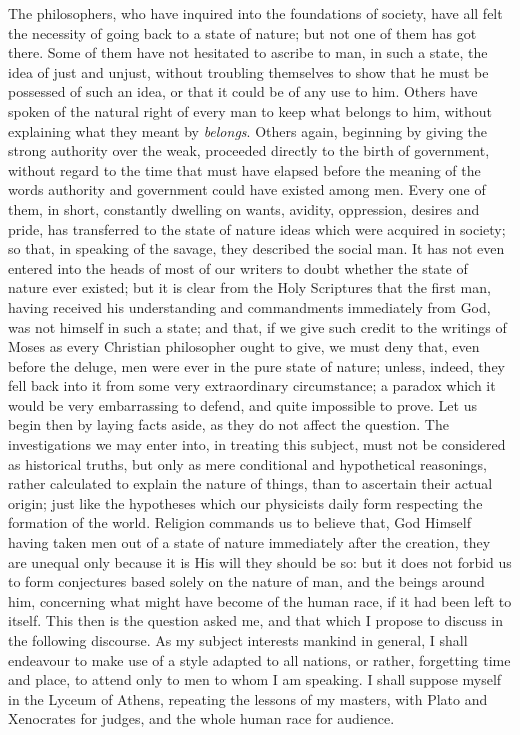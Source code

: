 \documentclass[12pt]{report}
\begin{document}
The philosophers, who have inquired into the foundations of society, have all felt the necessity of going back to a state of nature; but not one of them has got there. Some of them have not hesitated to ascribe to man, in such a state, the idea of just and unjust, without troubling themselves to show that he must be possessed of such an idea, or that it could be of any use to him. Others have spoken of the natural right of every man to keep what belongs to him, without explaining what they meant by \textit{belongs}. Others again, beginning by giving the strong authority over the weak, proceeded directly to the birth of government, without regard to the time that must have elapsed before the meaning of the words authority and government could have existed among men. Every one of them, in short, constantly dwelling on wants, avidity, oppression, desires and pride, has transferred to the state of nature ideas which were acquired in society; so that, in speaking of the savage, they described the social man. It has not even entered into the heads of most of our writers to doubt whether the state of nature ever existed; but it is clear from the Holy Scriptures that the first man, having received his understanding and commandments immediately from God, was not himself in such a state; and that, if we give such credit to the writings of Moses as every Christian philosopher ought to give, we must deny that, even before the deluge, men were ever in the pure state of nature; unless, indeed, they fell back into it from some very extraordinary circumstance; a paradox which it would be very embarrassing to defend, and quite impossible to prove.
Let us begin then by laying facts aside, as they do not affect the question. The investigations we may enter into, in treating this subject, must not be considered as historical truths, but only as mere conditional and hypothetical reasonings, rather calculated to explain the nature of things, than to ascertain their actual origin; just like the hypotheses which our physicists daily form respecting the formation of the world. Religion commands us to believe that, God Himself having taken men out of a state of nature immediately after the creation, they are unequal only because it is His will they should be so: but it does not forbid us to form conjectures based solely on the nature of man, and the beings around him, concerning what might have become of the human race, if it had been left to itself. This then is the question asked me, and that which I propose to discuss in the following discourse. As my subject interests mankind in general, I shall endeavour to make use of a style adapted to all nations, or rather, forgetting time and place, to attend only to men to whom I am speaking. I shall suppose myself in the Lyceum of Athens, repeating the lessons of my masters, with Plato and Xenocrates for judges, and the whole human race for audience.
\end{document}
